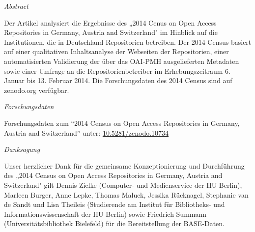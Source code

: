 \emph{Abstract}

Der Artikel analysiert die Ergebnisse des „2014 Cenus on Open Access
Repositories in Germany, Austria and Switzerland" im Hinblick auf die
Institutionen, die in Deutschland Repositorien betreiben. Der 2014
Census basiert auf einer qualitativen Inhaltsanalyse der Webseiten der
Repositorien, einer automatisierten Validierung der über das OAI-PMH
ausgelieferten Metadaten sowie einer Umfrage an die
Repositorienbetreiber im Erhebungszeitraum 6. Januar bis 13. Februar
2014. Die Forschungsdaten des 2014 Census sind auf zenodo.org verfügbar.

\emph{Forschungsdaten}

Forschungsdaten zum ``2014 Census on Open Access Repositories in
Germany, Austria and Switzerland'' unter:
\href{http://doi.org/10.5281/zenodo.10734}{10.5281/zenodo.10734}

\emph{Danksagung}

Unser herzlicher Dank für die gemeinsame Konzeptionierung und
Durchführung des „2014 Census on Open Access Repositories in Germany,
Austria and Switzerland" gilt Dennis Zielke (Computer- und Medienservice
der HU Berlin), Marleen Burger, Anne Lepke, Thomas Maluck, Jessika
Rücknagel, Stephanie van de Sandt und Lisa Theileis (Studierende am
Institut für Bibliotheks- und Informationswissenschaft der HU Berlin)
sowie Friedrich Summann (Universitätsbibliothek Bielefeld) für die
Bereitstellung der BASE-Daten.
